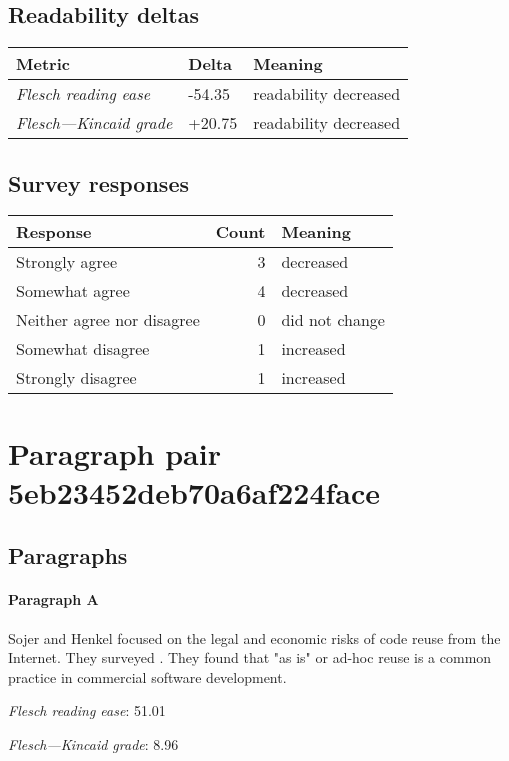 \subsection{Readability deltas}

\begin{tabular}{lll}
\toprule
               \textbf{Metric} & \textbf{Delta} &       \textbf{Meaning} \\
\midrule
    \emph{Flesch reading ease} &         -54.35 &  readability decreased \\
 \emph{Flesch---Kincaid grade} &         +20.75 &  readability decreased \\
\bottomrule
\end{tabular}

\subsection{Survey responses}
\begin{tabular}{lrl}
\toprule
          \textbf{Response} &  \textbf{Count} & \textbf{Meaning} \\
\midrule
             Strongly agree &               3 &        decreased \\
             Somewhat agree &               4 &        decreased \\
 Neither agree nor disagree &               0 &   did not change \\
          Somewhat disagree &               1 &        increased \\
          Strongly disagree &               1 &        increased \\
\bottomrule
\end{tabular}

\section{Paragraph pair 5eb23452deb70a6af224face}
\subsection{Paragraphs}
\paragraph{Paragraph A}
Sojer and Henkel focused on the legal and economic risks of code reuse from the Internet. They surveyed . They found that "as is" or ad-hoc reuse is a common practice in commercial software development.\par\medskip
\emph{Flesch reading ease}: 51.01\par
\emph{Flesch---Kincaid grade}: 8.96

